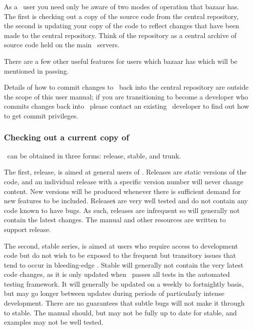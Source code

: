 As a \fluidity\ user you need only be aware of two modes of operation that
bazaar has. The first is checking out a copy of the source code from the
central repository, the second is updating your copy of the code to reflect
changes that have been made to the central repository. Think of the repository
as a central archive of source code held on the main \fluidity\ servers.

There are a few other useful features for users which bazaar has which will be
mentioned in passing.

Details of how to commit changes to \fluidity\ back into the central repository
are outside the scope of this user manual; if you are transitioning to become a
developer who commits changes back into \fluidity\ please contact an existing
\fluidity\ developer to find out how to get commit privileges.

\subsubsection{Checking out a current copy of \fluidity}
\label{sec:subversion_checkout_current}

\fluidity\ can be obtained in three forms: release, stable, and trunk.

The first, release, is aimed at general users of \fluidity. Releases are static
versions of the code, and an individual release with a specific version number
will never change content. New versions will be produced whenever there is
sufficient demand for new features to be included. Releaseѕ are very well
tested and do not contain any code known to have bugs. As such, releases are
infrequent so will generally not contain the latest changes. The manual and
other resources are written to support release.

The second, stable series, is aimed at users who require access to development
code but do not wish to be exposed to the frequent but transitory issues that
tend to occur in bleeding-edge \fluidity. Stable will generally not contain the
very latest code changes, as it is only updated when \fluidity\ passes all
tests in the automated testing framework. It will generally be updated on a
weekly to fortnightly basis, but may go longer between updates during periods
of particularly intense development. There are no guarantees that subtle bugs
will not make it through to stable. The manual should, but may not be fully up
to date for stable, and examples may not be well tested.

